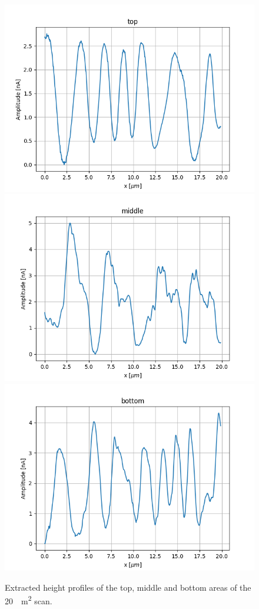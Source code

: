 \documentclass[%
 reprint,
amsmath,amssymb,
pra,
]{revtex4-1}
\begin{document}
\begin{figure}[t]
\centering
\includegraphics[scale=0.4]{Bilder/Magnetic/top.png}
\includegraphics[scale=0.4]{Bilder/Magnetic/mid.png}
\includegraphics[scale=0.4]{Bilder/Magnetic/bot.png}
\caption{Extracted height profiles of the top, middle and bottom areas of the \SI{20}{\mu m^2} scan.}
\label{fig:magnetic_profile}
\end{figure}
\end{document}

